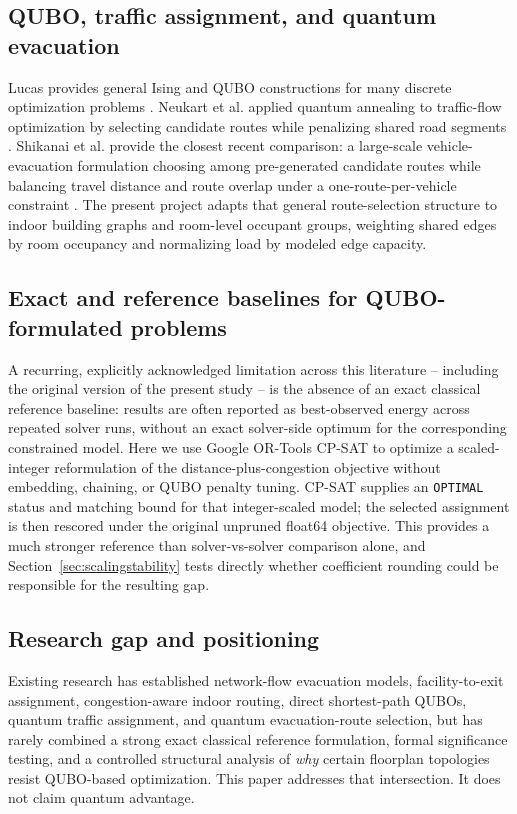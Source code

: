 \documentclass[11pt]{article}
\begin{document}
\subsection{QUBO, traffic assignment, and quantum evacuation}
Lucas provides general Ising and QUBO constructions for many discrete optimization problems \cite{lucas}. Neukart et al. applied quantum annealing to traffic-flow optimization by selecting candidate routes while penalizing shared road segments \cite{neukart}. Shikanai et al. provide the closest recent comparison: a large-scale vehicle-evacuation formulation choosing among pre-generated candidate routes while balancing travel distance and route overlap under a one-route-per-vehicle constraint \cite{shikanai}. The present project adapts that general route-selection structure to indoor building graphs and room-level occupant groups, weighting shared edges by room occupancy and normalizing load by modeled edge capacity.

\subsection{Exact and reference baselines for QUBO-formulated problems}
A recurring, explicitly acknowledged limitation across this literature -- including the original version of the present study -- is the absence of an exact classical reference baseline: results are often reported as best-observed energy across repeated solver runs, without an exact solver-side optimum for the corresponding constrained model. Here we use Google OR-Tools CP-SAT \cite{ortools} to optimize a scaled-integer reformulation of the distance-plus-congestion objective without embedding, chaining, or QUBO penalty tuning. CP-SAT supplies an \texttt{OPTIMAL} status and matching bound for that integer-scaled model; the selected assignment is then rescored under the original unpruned float64 objective. This provides a much stronger reference than solver-vs-solver comparison alone, and Section~\ref{sec:scalingstability} tests directly whether coefficient rounding could be responsible for the resulting gap.

\subsection{Research gap and positioning}
Existing research has established network-flow evacuation models, facility-to-exit assignment, congestion-aware indoor routing, direct shortest-path QUBOs, quantum traffic assignment, and quantum evacuation-route selection, but has rarely combined a strong exact classical reference formulation, formal significance testing, and a controlled structural analysis of \emph{why} certain floorplan topologies resist QUBO-based optimization. This paper addresses that intersection. It does not claim quantum advantage.
\end{document}
